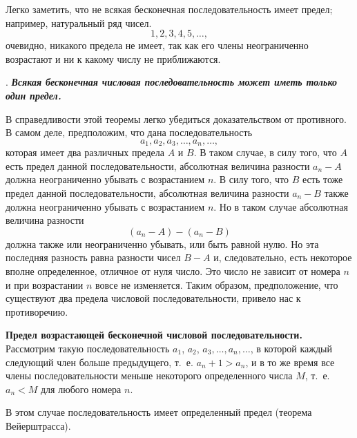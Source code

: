 \documentclass[oneside]{book}
\begin{document}
Легко заметить, что не всякая бесконечная последовательность имеет предел;
например, натуральный ряд чисел.
\[1, 2, 3, 4, 5,\dots,\]
очевидно, никакого предела не имеет, так как его члены неограниченно возрастают и ни к какому числу не приближаются.

.
\textbf{\emph{Всякая бесконечная числовая последовательность может иметь только один предел.}}

В справедливости этой теоремы легко убедиться доказательством от противного.
В самом деле, предположим, что дана последовательность
\[a_1,a_2,a_3,\dots,a_n,\dots,\]
которая имеет два различных предела $A$ и $B$.
В таком случае, в силу того, что $A$ есть предел данной последовательности, абсолютная величина разности $a_n-A$ должна неограниченно убывать с возрастанием $n$.
В силу того, что $B$ есть тоже предел данной последовательности, абсолютная величина разности $a_n-B$ также должна неограниченно убывать с возрастанием $n$.
Но в таком случае абсолютная величина разности
\[(a_n-A)-(a_n-B)\]
должна также или неограниченно убывать, или быть равной нулю.
Но эта последняя разность равна разности чисел $B-A$ и, следовательно, есть некоторое вполне определенное, отличное от нуля число.
Это число не зависит от номера $n$ и при возрастании $n$ вовсе не изменяется.
Таким образом, предположение, что существуют два предела числовой последовательности, привело нас к противоречию.

\textbf{Предел возрастающей бесконечной числовой последовательности.}
Рассмотрим такую последовательность $a_1$, $a_2$, $a_3,\dots,a_n,\dots$, в которой каждый следующий член больше предыдущего, т.~е. $a_n+1 > a_n$, и в то же время все члены последовательности меньше некоторого определенного числа $M$, т.~е. $a_n < M$ для любого номера $n$.

В этом случае последовательность имеет определенный предел (теорема Вейерштрасса).
\end{document}

